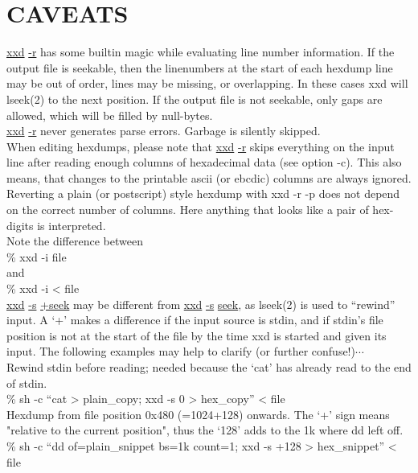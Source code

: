 \documentclass{ctexart}
\begin{document}
\section*{CAVEATS}
\begin{adjustwidth}{1cm}{0cm}
\underline{xxd}  \underline{-r}  has  some  builtin  magic while evaluating line
number information.  If the output file is seekable, then the linenumbers at the
start of each hexdump line may be out of order, lines may be missing, or
overlapping. In these cases xxd will lseek(2) to the next position. If the
output file is not seekable, only gaps  are  allowed,  which  will  be filled by
null-bytes. \\ 

\noindent \underline{xxd} \underline{-r} never generates parse errors. Garbage
is silently skipped. \\  

\noindent When  editing hexdumps, please note that \underline{xxd}
\underline{-r} skips everything on the input line after reading enough columns
of hexadecimal data (see option -c). This also means, that changes to the
printable ascii (or ebcdic) columns are always ignored. Reverting a plain (or
postscript) style hexdump with xxd -r -p does not depend on the correct  number
of  columns. Here anything that looks like a pair of hex-digits is interpreted.
\\ 

\noindent Note the difference between \\
\% xxd -i file \\
and \\
\% xxd -i < file \\

\noindent \underline{xxd} \underline{-s} \underline{+seek} may be different from
\underline{xxd} \underline{-s} \underline{seek}, as lseek(2) is used to
``rewind'' input.  A `+' makes a difference if the input source is stdin, and if
stdin's file position is not at the start of the file by the time xxd is started
and given its input.  The following examples may help to clarify (or further
confuse!)$\cdots$ \\ 

\noindent Rewind stdin before reading; needed because the `cat' has already read
to the end of stdin. \\   
\% sh -c ``cat > plain\_copy; xxd -s 0 > hex\_copy'' < file \\

\noindent Hexdump from file position 0x480 (=1024+128) onwards.  The `+' sign
means "relative to the current position", thus the `128' adds to the 1k where dd
left off. \\ 
\% sh -c ``dd of=plain\_snippet bs=1k count=1; xxd -s +128 > hex\_snippet'' <
file \\ 


\end{adjustwidth}
\end{document}
